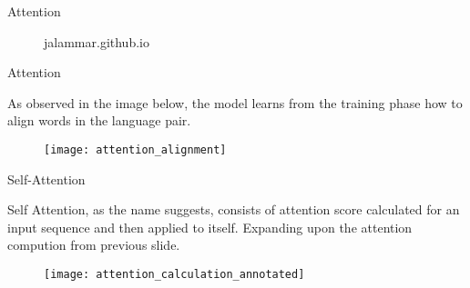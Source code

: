 \documentclass[10pt]{beamer}
\begin{document}
\begin{frame}[fragile]{Attention}

	\begin{figure}[h]
		\centering
		\caption{jalammar.github.io}
	\end{figure}

\end{frame}

\begin{frame}[fragile]{Attention}

	As observed in the image below, the model learns from the training phase how to align words in the language pair.

	\begin{figure}[h]
		\centering
		\texttt{[image: attention\_alignment]}
	\end{figure}

\end{frame}



\begin{frame}[fragile]{Self-Attention}

	Self Attention, as the name suggests, consists of attention score calculated for an input sequence and then applied
	to itself. Expanding upon the attention compution from previous slide.

	\begin{figure}[h]
		\centering
		\texttt{[image: attention\_calculation\_annotated]}
	\end{figure}

\end{frame}
\end{document}
